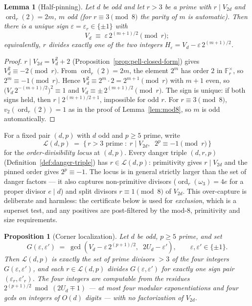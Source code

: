 \documentclass[11pt]{amsart}
\theoremstyle{plain}
\newtheorem{proposition}[theorem]{Proposition}
\newtheorem{lemma}[theorem]{Lemma}
\theoremstyle{definition}
\theoremstyle{remark}
\numberwithin{equation}{section}
\newcommand{\ord}{\operatorname{ord}}
\newcommand{\F}{\mathbb{F}}
\begin{document}
\begin{lemma}[Half-pinning]\label{lem:half-pinning}
Let $d$ be odd and let $r > 3$ be a prime with $r \mid V_{2d}$ and $\ord_r(2) = 2m$, $m$ odd (for $r \equiv 3 \pmod 8$ the parity of $m$ is automatic). Then there is a unique sign $\varepsilon = \varepsilon_r \in \{\pm 1\}$ with
\[
  V_d \;\equiv\; \varepsilon \, 2^{(m+1)/2} \pmod r;
\]
equivalently, $r$ divides exactly one of the two integers $H_{\varepsilon} = V_d - \varepsilon\, 2^{(m+1)/2}$.
\end{lemma}

\begin{proof}
$r \mid V_{2 d} = V_d^2 + 2$ (Proposition~\ref{prop:pell-closed-form}) gives $V_d^2 \equiv -2 \pmod r$. From $\ord_r(2) = 2 m$, the element $2^m$ has order $2$ in $\F_r^\times$, so $2^m \equiv -1 \pmod r$. Hence $V_d^2 \equiv 2^m \cdot 2 = 2^{m+1} \pmod r$ with $m + 1$ even, so $\bigl(V_d \, 2^{-(m+1)/2}\bigr)^2 \equiv 1$ and $V_d \equiv \pm\, 2^{(m+1)/2} \pmod r$. The sign is unique: if both signs held, then $r \mid 2^{(m+1)/2 + 1}$, impossible for odd $r$. For $r \equiv 3 \pmod 8$, $v_2(\ord_r(2)) = 1$ as in the proof of Lemma~\ref{lem:mod8}, so $m$ is odd automatically.
\end{proof}

For a fixed pair $(d, p)$ with $d$ odd and $p \geq 5$ prime, write
\[
  \mathcal{L}(d, p) \;=\; \{\, r > 3 \text{ prime} \;:\; r \mid V_{2 d},\;\; 2^p \equiv -1 \pmod r \,\}
\]
for the \emph{order-divisibility locus} at $(d, p)$. Every danger triple $(d, r, p)$ (Definition~\ref{def:danger-triple}) has $r \in \mathcal{L}(d, p)$: primitivity gives $r \mid V_{2 d}$ and the pinned order gives $2^p \equiv -1$. The locus is in general strictly larger than the set of danger factors --- it also captures non-primitive divisors ($\ord_r(\omega_3) = 4 e$ for a proper divisor $e \mid d$) and split divisors $r \equiv 1 \pmod 8$ of $V_{2 d}$. This over-capture is deliberate and harmless: the certificate below is used for \emph{exclusion}, which is a superset test, and any positives are post-filtered by the mod-$8$, primitivity and size requirements.

\begin{proposition}[Corner localization]\label{prop:corner-localization}
Let $d$ be odd, $p \geq 5$ prime, and set
\[
  G(\varepsilon, \varepsilon') \;=\; \gcd\!\left(V_d - \varepsilon\, 2^{(p+1)/2},\;\; 2 U_d - \varepsilon'\right), \qquad \varepsilon, \varepsilon' \in \{\pm 1\}.
\]
Then $\mathcal{L}(d, p)$ is exactly the set of prime divisors $> 3$ of the four integers $G(\varepsilon, \varepsilon')$, and each $r \in \mathcal{L}(d, p)$ divides $G(\varepsilon, \varepsilon')$ for exactly one sign pair $(\varepsilon_r, \varepsilon'_r)$. The four integers are computable from the residues $2^{(p+1)/2} \bmod (2 U_d \mp 1)$ --- at most four modular exponentiations and four gcds on integers of $O(d)$ digits --- with no factorization of $V_{2 d}$.
\end{proposition}
\end{document}
